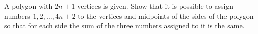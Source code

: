 A polygon with $2n+1$ vertices is given. Show that it is possible to assign numbers $1,2,\ldots ,4n+2$ to the vertices and midpoints of the sides of the polygon so that for each side the sum of the three numbers assigned to it is the same.